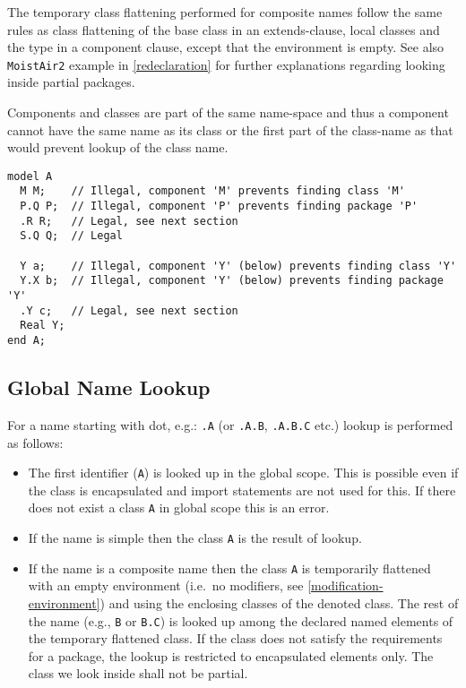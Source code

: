 \begin{nonnormative}
The temporary class flattening performed for composite names
follow the same rules as class flattening of the base class in an
extends-clause, local classes and the type in a component clause, except
that the environment is empty. See also \lstinline!MoistAir2! example in
\cref{redeclaration} for further explanations regarding looking inside
partial packages.
\end{nonnormative}
\begin{example}
Components and classes are part of the same name-space and thus a component cannot
have the same name as its class or the first part of the class-name as that
would prevent lookup of the class name.
\begin{lstlisting}[language=modelica]
model A
  M M;    // Illegal, component 'M' prevents finding class 'M'
  P.Q P;  // Illegal, component 'P' prevents finding package 'P'
  .R R;   // Legal, see next section
  S.Q Q;  // Legal

  Y a;    // Illegal, component 'Y' (below) prevents finding class 'Y'
  Y.X b;  // Illegal, component 'Y' (below) prevents finding package 'Y'
  .Y c;   // Legal, see next section
  Real Y;
end A;
\end{lstlisting}
\end{example}

\subsection{Global Name Lookup}\label{global-name-lookup}

For a name starting with dot, e.g.: \lstinline!.A! (or \lstinline!.A.B!, \lstinline!.A.B.C! etc.) lookup is performed as follows:
\begin{itemize}
\item
  The first identifier (\lstinline!A!) is looked up in the global scope. This is
  possible even if the class is encapsulated and import statements are
  not used for this. If there does not exist a class \lstinline!A! in global scope
  this is an error.
\item
  If the name is simple then the class \lstinline!A! is the result of lookup.
\item
  If the name is a composite name then the class \lstinline!A! is temporarily
  flattened with an empty environment (i.e.\ no modifiers, see
  \cref{modification-environment}) and using the enclosing classes of the denoted class. The rest
  of the name (e.g., \lstinline!B! or \lstinline!B.C!) is looked up among the declared named
  elements of the temporary flattened class. If the class does not
  satisfy the requirements for a package, the lookup is restricted to
  encapsulated elements only. The class we look inside shall not be
  partial.
\end{itemize}

